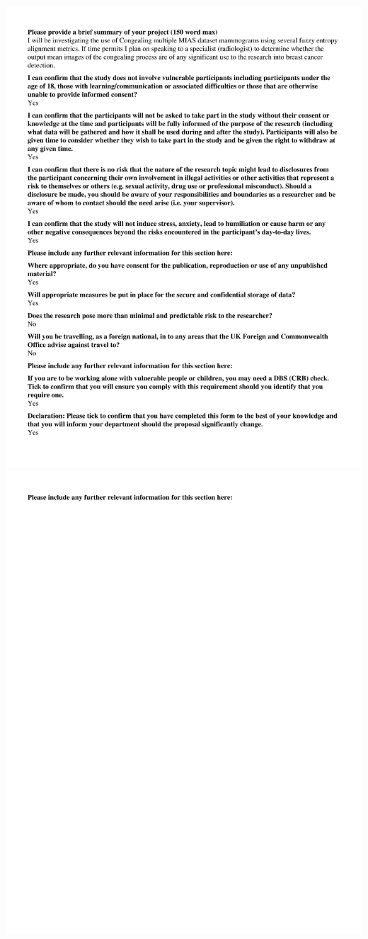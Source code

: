   \includegraphics[scale=0.4]{Appendix2/3958-2.png}
  \newpage
  \includegraphics[scale=0.4]{Appendix2/3958-3.png}

